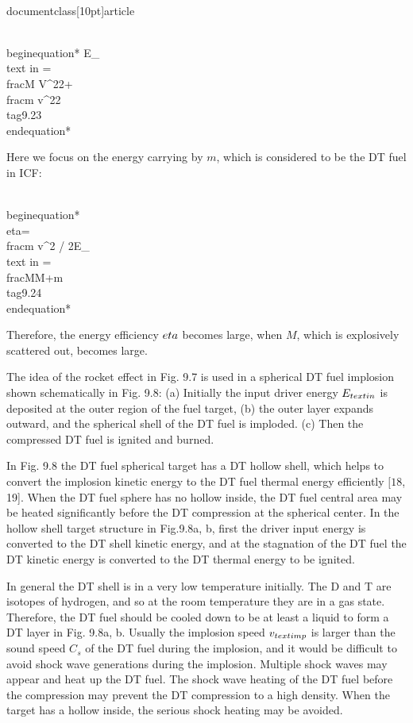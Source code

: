 \\documentclass[10pt]{article}
\begin{document}
{{{{{{\\begin{equation*}
E_{\\text {in }}=\\frac{M V^{2}}{2}+\\frac{m v^{2}}{2} \\tag{9.23}
\\end{equation*}


Here we focus on the energy carrying by $m$, which is considered to be the DT fuel in ICF:


\\begin{equation*}
\\eta=\\frac{m v^{2} / 2}{E_{\\text {in }}}=\\frac{M}{M+m} \\tag{9.24}
\\end{equation*}


Therefore, the energy efficiency $\\eta$ becomes large, when $M$, which is explosively scattered out, becomes large.

The idea of the rocket effect in Fig. 9.7 is used in a spherical DT fuel implosion shown schematically in Fig. 9.8: (a) Initially the input driver energy $E_{\\text {in }}$ is deposited at the outer region of the fuel target, (b) the outer layer expands outward, and the spherical shell of the DT fuel is imploded. (c) Then the compressed DT fuel is ignited and burned.

In Fig. 9.8 the DT fuel spherical target has a DT hollow shell, which helps to convert the implosion kinetic energy to the DT fuel thermal energy efficiently $[18$, 19]. When the DT fuel sphere has no hollow inside, the DT fuel central area may be heated significantly before the DT compression at the spherical center. In the hollow shell target structure in Fig.9.8a, b, first the driver input energy is converted to the DT shell kinetic energy, and at the stagnation of the DT fuel the DT kinetic energy is converted to the DT thermal energy to be ignited.

In general the DT shell is in a very low temperature initially. The D and T are isotopes of hydrogen, and so at the room temperature they are in a gas state. Therefore, the DT fuel should be cooled down to be at least a liquid to form a DT layer in Fig. 9.8a, b. Usually the implosion speed $v_{\\text {imp }}$ is larger than the sound speed $C_{s}$ of
the DT fuel during the implosion, and it would be difficult to avoid shock wave generations during the implosion. Multiple shock waves may appear and heat up the DT fuel. The shock wave heating of the DT fuel before the compression may prevent the DT compression to a high density. When the target has a hollow inside, the serious shock heating may be avoided.

}}}}}}
\end{document}
